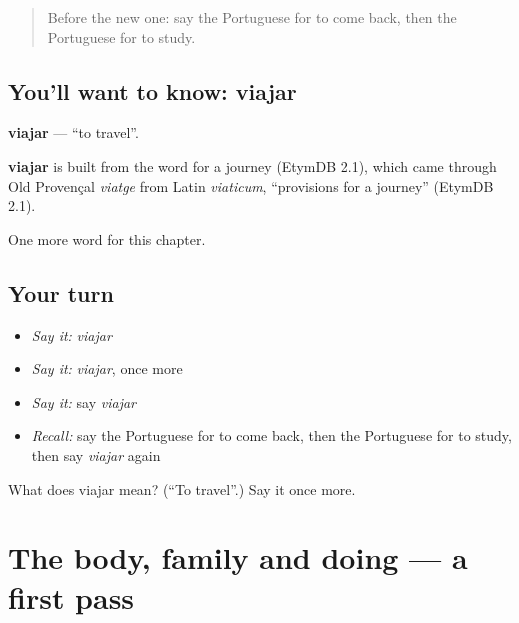 \label{lesson:PT-C55-viajar}



\begin{quote}
Before the new one: say the Portuguese for to come back, then the Portuguese for to study.
\end{quote}

\subsection*{You'll want to know: viajar}
\textbf{viajar} — \textquotedblleft{}to travel\textquotedblright{}.

\begin{cousinweb}
\textbf{viajar} is built from the word for a journey (EtymDB 2.1), which came through Old Provençal \emph{viatge} from Latin \emph{viaticum}, \textquotedblleft{}provisions for a journey\textquotedblright{} (EtymDB 2.1).
\end{cousinweb}

\begin{grammarlens}[title={What you've built}]
One more word for this chapter.
\end{grammarlens}

\subsection*{Your turn}
\begin{itemize}
\raggedright
  \item \emph{Say it:} \emph{viajar}
  \item \emph{Say it:} \emph{viajar}, once more
  \item \emph{Say it:} say \emph{viajar}
  \item \emph{Recall:} say the Portuguese for to come back, then the Portuguese for to study, then say \emph{viajar} again
\end{itemize}

\begin{tcolorbox}[breakable,colback=teal!4,colframe=teal!35!black,title={Before you move on}]
What does viajar mean? (\textquotedblleft{}To travel\textquotedblright{}.) Say it once more.
\end{tcolorbox}
\section[(dialogue)]{The body, family and doing — a first pass}

\label{lesson:PT-R55-first-pass-the-body-family-and-doing}



